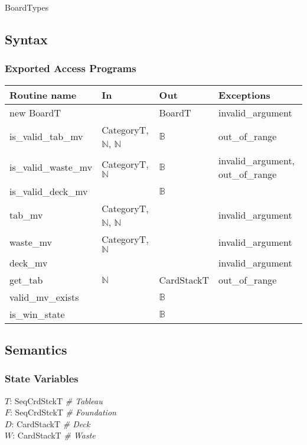\documentclass[12pt]{article}
\begin{document}
\noindent BoardTypes

\subsection* {Syntax}



\subsubsection* {Exported Access Programs}

\begin{tabular}{| l | l | l | l |}
\hline
\textbf{Routine name} & \textbf{In} & \textbf{Out} & \textbf{Exceptions}\\
\hline
new BoardT  &  & BoardT & invalid\_argument\\
\hline
is\_valid\_tab\_mv & CategoryT, $\mathbb{N}$, $\mathbb{N}$ & $\mathbb{B}$ & out\_of\_range\\
\hline
is\_valid\_waste\_mv & CategoryT, $\mathbb{N}$ & $\mathbb{B}$ &
                                                                invalid\_argument, out\_of\_range\\
\hline
is\_valid\_deck\_mv &  &  $\mathbb{B}$ & \\
\hline
tab\_mv & CategoryT, $\mathbb{N}$, $\mathbb{N}$ & & invalid\_argument\\
\hline
waste\_mv & CategoryT, $\mathbb{N}$ & & invalid\_argument\\
\hline
deck\_mv &  & & invalid\_argument\\
\hline
get\_tab & $\mathbb{N}$ & CardStackT & out\_of\_range\\
\hline

valid\_mv\_exists & & $\mathbb{B}$ &\\
\hline
is\_win\_state & & $\mathbb{B}$ & \\
\hline
\end{tabular}

\subsection* {Semantics}

\subsubsection* {State Variables}

$T$: SeqCrdStckT \textit{\# Tableau}\\
$F$: SeqCrdStckT \textit{\# Foundation}\\
$D$: CardStackT \textit{\# Deck}\\
$W$: CardStackT \textit{\# Waste}\\
\end{document}
